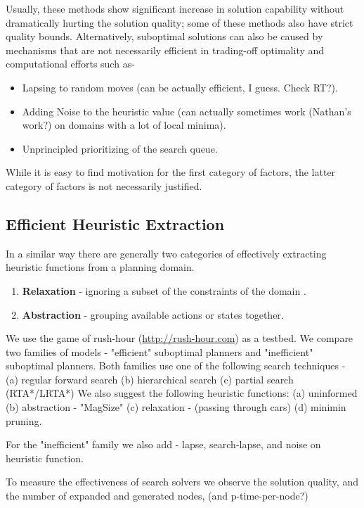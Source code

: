 \documentclass[10pt,letterpaper]{article}
\begin{document}
Usually, these methods show significant increase in solution capability without dramatically hurting the solution quality; some of these methods also have strict quality bounds. 
Alternatively, suboptimal solutions can also be caused by mechanisms that are not necessarily efficient in trading-off optimality and computational efforts such as-

\begin{itemize}
	\item Lapsing to random moves  (can be actually efficient, I guess. Check RT?).
	\item Adding Noise to the heuristic value (can actually sometimes work (Nathan's work?) on domains with a lot of local minima).
	\item Unprincipled prioritizing of the search queue.
\end{itemize}

While it is easy to find motivation for the first category of factors, the latter category of factors is not necessarily justified. 

\subsection{Efficient Heuristic Extraction}
In a similar way there are generally two categories of effectively extracting heuristic functions from a planning domain.  
\begin{enumerate}
\item {\bf Relaxation} - ignoring a subset of the constraints of the domain . 
\item {\bf Abstraction} - grouping available actions or states together. 
\end{enumerate}


We use the game of rush-hour (\url{http://rush-hour.com}) as a testbed.
We compare two families of models - "efficient" suboptimal planners and "inefficient" suboptimal planners.  
Both families use one of the following search techniques - (a) regular forward search (b) hierarchical search  (c) partial search (RTA*/LRTA*)
We also suggest the following heuristic functions:  (a) uninformed (b) abstraction - "MagSize" (c) relaxation - (passing through cars) (d) minimin pruning. 

For the "inefficient" family we also add - lapse, search-lapse, and noise on heuristic function.  

To measure the effectiveness of search solvers we observe the solution quality, and the number of expanded and generated nodes, (and p-time-per-node?)
\end{document}
